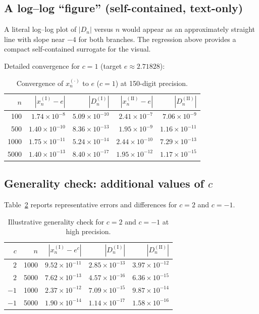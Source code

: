 \documentclass[11pt]{article}
\theoremstyle{definition}
\begin{document}
\subsection{A log--log ``figure'' (self-contained, text-only)}
A literal log--log plot of $|D_n|$ versus $n$ would appear as an approximately
straight line with slope near $-4$ for both branches. The regression above
provides a compact self-contained surrogate for the visual.

Detailed convergence for $c=1$ (target $e\approx2.71828$):

\begin{table}[h]\centering
\begin{tabular}{rrrrr}
\toprule
$n$ & $|x_n^{(\mathrm{I})}-e|$ & $|D_n^{(\mathrm{I})}|$ & $|x_n^{(\mathrm{II})}-e|$ & $|D_n^{(\mathrm{II})}|$\\
\midrule
100  & $1.74\times10^{-8}$  & $5.09\times10^{-10}$ & $2.41\times10^{-7}$  & $7.06\times10^{-9}$\\
500  & $1.40\times10^{-10}$ & $8.36\times10^{-13}$ & $1.95\times10^{-9}$  & $1.16\times10^{-11}$\\
1000 & $1.75\times10^{-11}$ & $5.24\times10^{-14}$ & $2.44\times10^{-10}$ & $7.29\times10^{-13}$\\
5000 & $1.40\times10^{-13}$ & $8.40\times10^{-17}$ & $1.95\times10^{-12}$ & $1.17\times10^{-15}$\\
\bottomrule
\end{tabular}
\caption{Convergence of $x_n^{(\cdot)}$ to $e$ ($c=1$) at 150-digit precision.}
\label{tab:c1}
\end{table}

\subsection{Generality check: additional values of $c$}
Table~\ref{tab:gen} reports representative errors and differences for $c=2$ and
$c=-1$.

\begin{table}[h]\centering
\begin{tabular}{rrrrr}
\toprule
$c$ & $n$ & $|x_n^{(\mathrm{I})}-e^{c}|$ & $|D_n^{(\mathrm{I})}|$ & $|D_n^{(\mathrm{II})}|$\\
\midrule
$2$  & 1000 & $9.52\times10^{-11}$ & $2.85\times10^{-13}$ & $3.97\times10^{-12}$\\
$2$  & 5000 & $7.62\times10^{-13}$ & $4.57\times10^{-16}$ & $6.36\times10^{-15}$\\
$-1$ & 1000 & $2.37\times10^{-12}$ & $7.09\times10^{-15}$ & $9.87\times10^{-14}$\\
$-1$ & 5000 & $1.90\times10^{-14}$ & $1.14\times10^{-17}$ & $1.58\times10^{-16}$\\
\bottomrule
\end{tabular}
\caption{Illustrative generality check for $c=2$ and $c=-1$ at high precision.}
\label{tab:gen}
\end{table}
\end{document}

